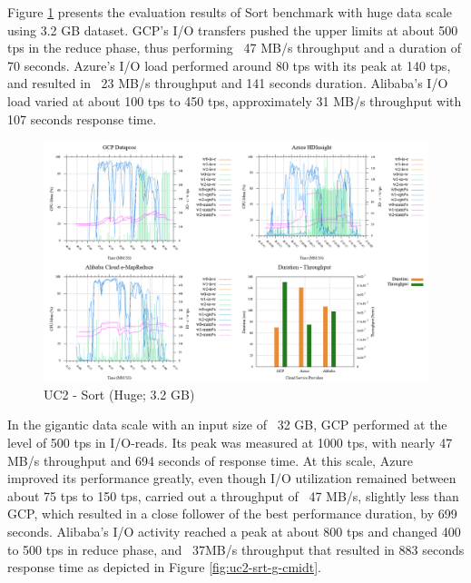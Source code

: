 \documentclass[review]{elsarticle}
\begin{document}
Figure \ref{fig:uc2-srt-h-cmidt} presents the evaluation results of Sort benchmark with huge data scale using 3.2 GB dataset. GCP's I/O transfers pushed the upper limits at about 500 tps in the reduce phase, thus performing ~47 MB/s throughput and a duration of 70 seconds. Azure's I/O load performed around 80 tps with its peak at 140 tps, and resulted in ~23 MB/s throughput and 141 seconds duration. Alibaba's I/O load varied at about 100 tps to 450 tps, approximately 31 MB/s throughput with 107 seconds response time. 

\begin{figure}[p]
	\caption{UC2 - Sort (Huge; 3.2 GB)}
	\label{fig:uc2-srt-h-cmidt}
	\includegraphics[width=\textwidth]{uc2-srt-h-cmidt}
	\centering
\end{figure}

In the gigantic data scale with an input size of ~32 GB, GCP performed at the level of 500 tps in I/O-reads. Its peak was measured at 1000 tps, with nearly 47 MB/s throughput and 694 seconds of response time. At this scale, Azure improved its performance greatly, even though I/O utilization remained between about 75 tps to 150 tps, carried out a throughput of ~47 MB/s, slightly less than GCP, which resulted in a close follower of the best performance duration, by 699 seconds. Alibaba's I/O activity reached a peak at about 800 tps and changed 400 to 500 tps in reduce phase, and ~37MB/s throughput that resulted in 883 seconds response time as depicted in Figure \ref{fig:uc2-srt-g-cmidt}.
\end{document}
